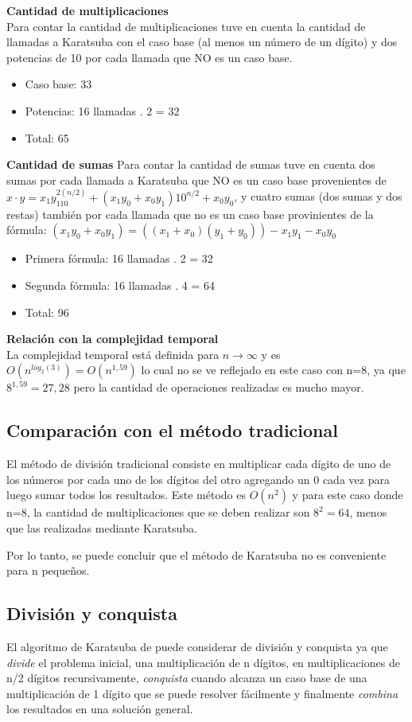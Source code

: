 \documentclass[titlepage,a4paper]{article}
\begin{document}
\textbf{Cantidad de multiplicaciones} \\
Para contar la cantidad de multiplicaciones tuve en cuenta la cantidad de llamadas a Karatsuba con el caso base (al menos un número de un dígito) y dos potencias de 10 por cada llamada que NO es un caso base.
\begin{itemize}
    \item Caso base: 33
    \item Potencias: 16 llamadas . 2 = 32
    \item Total: 65
\end{itemize}

\textbf{Cantidad de sumas}
Para contar la cantidad de sumas tuve en cuenta dos sumas por cada llamada a Karatsuba que NO es un caso base provenientes de $ x\cdot y=x_1y_110^{2(n/2)}+(x_1y_0+x_0y_1)10^{n/2}+x_0y_0 $,  y cuatro sumas (dos sumas y dos restas) también por cada llamada que no es un caso base provinientes de la fórmula: $(x_1y_0+x_0y_1)=((x_1+x_0)(y_1+y_0))-x_1y_1-x_0y_0$
\begin{itemize}
    \item Primera fórmula: 16 llamadas . 2 = 32
    \item Segunda fórmula: 16 llamadas . 4 = 64
    \item Total: 96
\end{itemize}

\textbf{Relación con la complejidad temporal} \\
La complejidad temporal está definida para $n\longrightarrow\infty$ y es $O(n^{log_2(3)})=O(n^{1,59})$ lo cual no se ve reflejado en este caso con n=8, ya que $8^{1,59}=27,28$ pero la cantidad de operaciones realizadas es mucho mayor. 


\subsection{Comparación con el método tradicional}
El método de división tradicional consiste en multiplicar cada dígito de uno de los números por cada uno de los dígitos del otro agregando un 0 cada vez para luego sumar todos los resultados. 
Este método es $O(n^2)$ y para este caso donde n=8, la cantidad de multiplicaciones que se deben realizar son $8^2=64$, menos que las realizadas mediante Karatsuba.\par 
Por lo tanto, se puede concluir que el método de Karatsuba no es conveniente para n pequeños.



\subsection{División y conquista}
El algoritmo de Karatsuba de puede considerar de división y conquista ya que \emph{divide} el problema inicial, una multiplicación de n dígitos, en multiplicaciones de n/2 dígitos recursivamente, \emph{conquista} cuando alcanza un caso base de una multiplicación de 1 dígito que se puede resolver fácilmente y finalmente \emph{combina} los resultados en una solución general. \par 
 
\end{document}
